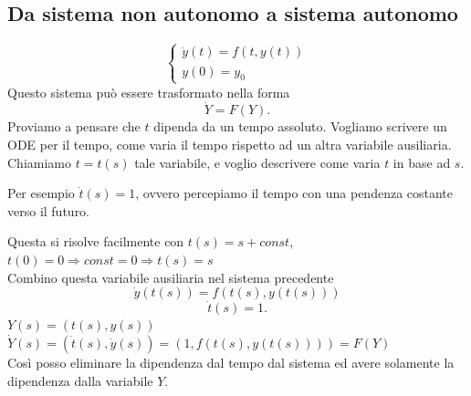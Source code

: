 \documentclass[12px]{article}
\begin{document}
\subsection{Da sistema non autonomo a sistema autonomo}
\[
\begin{cases}
	\dot y(t) = f(t,y(t))\\
	y(0) = y_0
\end{cases}
\]
Questo sistema può essere trasformato nella forma
\[
\dot Y = F(Y)
.\] 
Proviamo a pensare che $t$ dipenda da un tempo assoluto. Vogliamo scrivere un ODE per il tempo, come varia il tempo rispetto ad un altra variabile ausiliaria.\\
Chiamiamo $t = t(s)$ tale variabile, e voglio descrivere come varia $t$ in base ad $s$.

Per esempio  $\dot t(s) = 1$, ovvero percepiamo il tempo con una pendenza costante verso il futuro. 

Questa si risolve facilmente con $t(s) = s + const$,  $t(0) = 0 \Rightarrow const = 0 \Rightarrow  t(s) = s$ \\

Combino questa variabile ausiliaria nel sistema precedente
\[
\dot y(t(s)) = f(t(s),y(t(s)))
\]\[\dot t (s) = 1
.\] 
$Y(s) = (t(s), y(s))$ \\
$\dot Y(s) = (\dot t(s), \dot y(s)) = (1,f(t(s),y(t(s)))) = F(Y)$ \\

Così posso eliminare la dipendenza dal tempo dal sistema ed avere solamente la dipendenza dalla variabile $Y$.\\
\end{document}

